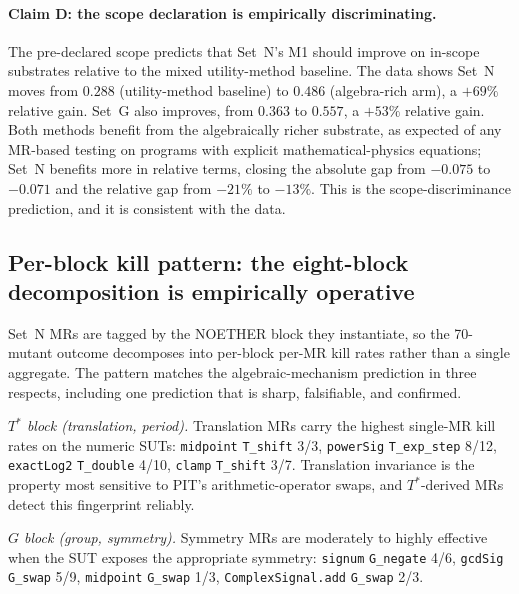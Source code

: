 \paragraph{Claim D: the scope declaration is empirically discriminating.}
The pre-declared scope predicts that Set~N's M1 should improve on
in-scope substrates relative to the mixed utility-method baseline.
The data shows Set~N moves from $0.288$ (utility-method baseline) to
$0.486$ (algebra-rich arm), a $+69\%$ relative gain. Set~G also
improves, from $0.363$ to $0.557$, a $+53\%$ relative gain. Both
methods benefit from the algebraically richer substrate, as expected
of any MR-based testing on programs with explicit mathematical-physics
equations; Set~N benefits more in relative terms, closing the
absolute gap from $-0.075$ to $-0.071$ and the relative gap from
$-21\%$ to $-13\%$. This is the scope-discriminance prediction, and
it is consistent with the data.

\subsection{Per-block kill pattern: the eight-block decomposition is empirically operative}
\label{subsec:per-block-kill}

Set~N MRs are tagged by the NOETHER block they instantiate, so the
70-mutant outcome decomposes into per-block per-MR kill rates rather
than a single aggregate. The pattern matches the algebraic-mechanism
prediction in three respects, including one prediction that is sharp,
falsifiable, and confirmed.

\textit{$T^{*}$ block (translation, period).} Translation MRs carry
the highest single-MR kill rates on the numeric SUTs:
\texttt{midpoint} \texttt{T\_shift} 3/3, \texttt{powerSig}
\texttt{T\_exp\_step} 8/12, \texttt{exactLog2} \texttt{T\_double}
4/10, \texttt{clamp} \texttt{T\_shift} 3/7. Translation invariance is
the property most sensitive to PIT's arithmetic-operator swaps, and
$T^{*}$-derived MRs detect this fingerprint reliably.

\textit{$G$ block (group, symmetry).} Symmetry MRs are moderately to
highly effective when the SUT exposes the appropriate symmetry:
\texttt{signum} \texttt{G\_negate} 4/6, \texttt{gcdSig}
\texttt{G\_swap} 5/9, \texttt{midpoint} \texttt{G\_swap} 1/3,
\texttt{ComplexSignal.add} \texttt{G\_swap} 2/3.

